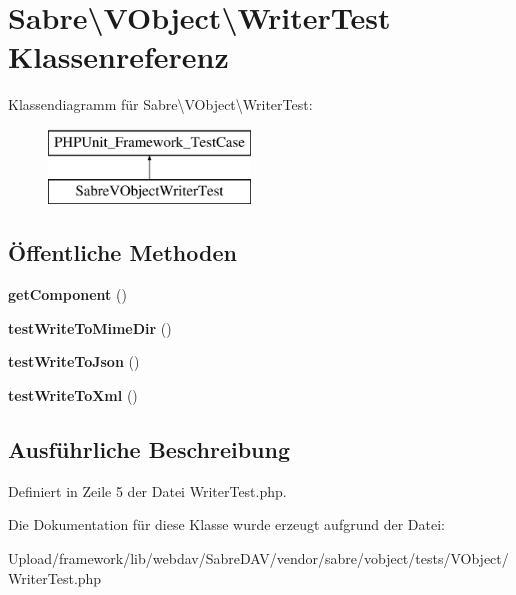 \hypertarget{class_sabre_1_1_v_object_1_1_writer_test}{}\section{Sabre\textbackslash{}V\+Object\textbackslash{}Writer\+Test Klassenreferenz}
\label{class_sabre_1_1_v_object_1_1_writer_test}
Klassendiagramm für Sabre\textbackslash{}V\+Object\textbackslash{}Writer\+Test\+:\begin{figure}[H]
\begin{center}
\leavevmode
\includegraphics[height=2.000000cm]{class_sabre_1_1_v_object_1_1_writer_test}
\end{center}
\end{figure}
\subsection*{Öffentliche Methoden}
\begin{DoxyCompactItemize}
\item 
\mbox{\label{class_sabre_1_1_v_object_1_1_writer_test_a73cdbf0e034815e16d68981cdf94b4ee}} 
{\bfseries get\+Component} ()
\item 
\mbox{\label{class_sabre_1_1_v_object_1_1_writer_test_acada975b156d0666b55e916ae043dd96}} 
{\bfseries test\+Write\+To\+Mime\+Dir} ()
\item 
\mbox{\label{class_sabre_1_1_v_object_1_1_writer_test_a2dcc0ab189757c0e61342036e66d1e43}} 
{\bfseries test\+Write\+To\+Json} ()
\item 
\mbox{\label{class_sabre_1_1_v_object_1_1_writer_test_a796428fb9d7db86b75302c7a49d1b1e0}} 
{\bfseries test\+Write\+To\+Xml} ()
\end{DoxyCompactItemize}


\subsection{Ausführliche Beschreibung}


Definiert in Zeile 5 der Datei Writer\+Test.\+php.



Die Dokumentation für diese Klasse wurde erzeugt aufgrund der Datei\+:\begin{DoxyCompactItemize}
\item 
Upload/framework/lib/webdav/\+Sabre\+D\+A\+V/vendor/sabre/vobject/tests/\+V\+Object/Writer\+Test.\+php\end{DoxyCompactItemize}
